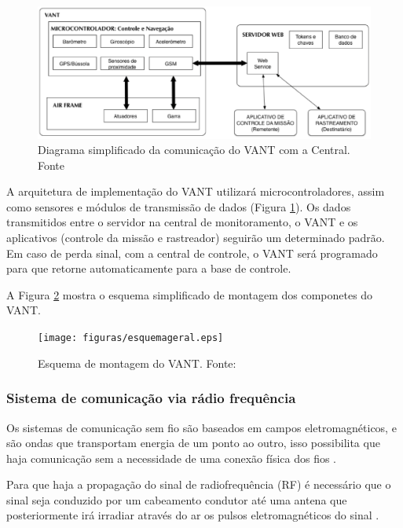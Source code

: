 \begin{figure}[H]
	\centering
	  \includegraphics[keepaspectratio=true,scale=0.7]{figuras/diagrama.eps}
	\caption[Diagrama simplificado da comunicação do VANT com a Central.]{Diagrama simplificado da comunicação do VANT com a Central. Fonte \cite{Branco}}
	\label{fig:diagrama}
\end{figure}

A arquitetura de implementação do VANT utilizará microcontroladores, assim como sensores e módulos de transmissão de dados (Figura \ref{fig:diagrama}).
Os dados transmitidos entre o servidor na central de monitoramento, o VANT e os aplicativos (controle da missão e rastreador) seguirão um determinado padrão. Em caso de perda sinal, com a central de controle, o VANT será programado para que retorne automaticamente para a base de controle.

A Figura \ref{fig:esquemageral} mostra o esquema simplificado de montagem dos componetes do VANT.

\begin{figure}[H]
	\centering
	  \texttt{[image: figuras/esquemageral.eps]}
	\caption{Esquema de montagem do VANT. Fonte:\cite{esquematico}}
	\label{fig:esquemageral}
\end{figure}

\pagebreak



\subsubsection{Sistema de comunicação via rádio frequência}

Os sistemas de comunicação sem fio são baseados em campos eletromagnéticos, e são ondas que transportam energia de um ponto ao outro, isso possibilita que haja comunicação sem a necessidade de uma conexão física dos fios \cite{VALLE1}. 

Para que haja a propagação do sinal de radiofrequência (RF) é necessário que o sinal seja conduzido por um cabeamento condutor até uma antena que posteriormente irá irradiar através do ar os pulsos eletromagnéticos do sinal \cite{VALLE1}. 

